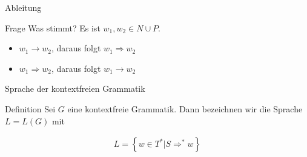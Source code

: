 	\begin{frame}{Ableitung}
    	\begin{block}{Frage}
        	Was stimmt? Es ist $w_1, w_2 \in N \cup P$.
        	
        	\begin{itemize}
            	\item $w_1 \rightarrow w_2$, daraus folgt $w_1 \Rightarrow w_2$
            	\item $w_1 \Rightarrow w_2$, daraus folgt $w_1 \rightarrow w_2$
        	\end{itemize}
    	\end{block}
	\end{frame}

	\begin{frame}{Sprache der kontextfreien Grammatik}
    	\begin{block}{Definition}
        	Sei $G$ eine kontextfreie Grammatik. 
        	Dann bezeichnen wir die Sprache $L = L\left(G\right)$ mit 
        
        	\begin{align*}
            	L = \left\{ w\in T^* \big| S \Rightarrow^* w\right\}
        	\end{align*}
    	\end{block}
    
    	\pause
	\end{frame}	
	
	
	
